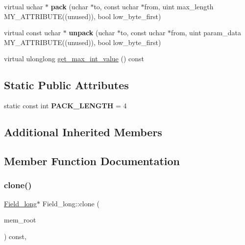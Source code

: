\begin{DoxyCompactItemize}
virtual uchar $\ast$ {\bfseries pack} (uchar $\ast$to, const uchar $\ast$from, uint max\+\_\+length M\+Y\+\_\+\+A\+T\+T\+R\+I\+B\+U\+TE((unused)), bool low\+\_\+byte\+\_\+first)
\item 
\mbox{\label{classField__long_a67a7ea32a37923b4842d9a5df502fc4a}} 
virtual const uchar $\ast$ {\bfseries unpack} (uchar $\ast$to, const uchar $\ast$from, uint param\+\_\+data M\+Y\+\_\+\+A\+T\+T\+R\+I\+B\+U\+TE((unused)), bool low\+\_\+byte\+\_\+first)
\item 
virtual ulonglong \mbox{\hyperlink{classField__long_aa28b8083eaced25f1c5e710af68eb44e}{get\+\_\+max\+\_\+int\+\_\+value}} () const
\end{DoxyCompactItemize}
\subsection*{Static Public Attributes}
\begin{DoxyCompactItemize}
\item 
\mbox{\label{classField__long_af0887489314e5f33ffa8cd5946ba4115}} 
static const int {\bfseries P\+A\+C\+K\+\_\+\+L\+E\+N\+G\+TH} = 4
\end{DoxyCompactItemize}
\subsection*{Additional Inherited Members}


\subsection{Member Function Documentation}
\mbox{\label{classField__long_aa05a09ef26e05bb90e4b032c33a3aa52}} 
\subsubsection{\texorpdfstring{clone()}{clone()}\hspace{0.1cm}{\footnotesize\ttfamily [1/2]}}
{\footnotesize\ttfamily \mbox{\hyperlink{classField__long}{Field\+\_\+long}}$\ast$ Field\+\_\+long\+::clone (\begin{DoxyParamCaption}\item[{M\+E\+M\+\_\+\+R\+O\+OT $\ast$}]{mem\+\_\+root }\end{DoxyParamCaption}) const\hspace{0.3cm}{\ttfamily [inline]}, {\ttfamily [virtual]}}


